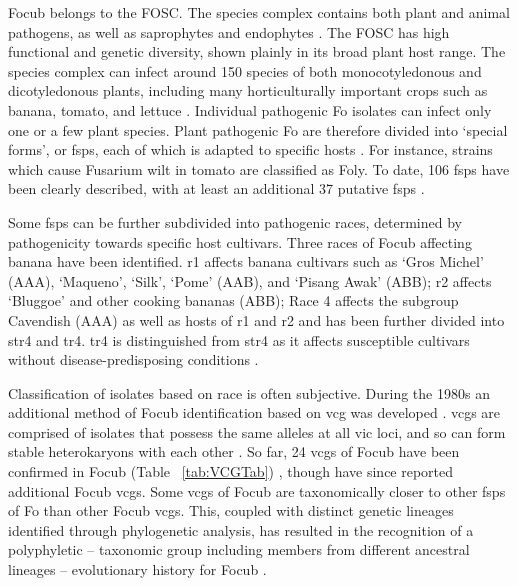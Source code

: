 \ac{Focub} belongs to the \acf{FOSC}. The species complex contains both plant and animal pathogens, as well as saprophytes and endophytes \parencite{Leslie2006}. The \ac{FOSC} has high functional and genetic diversity, shown plainly in its broad plant host range. The species complex can infect around 150 species of both monocotyledonous and dicotyledonous plants, including many horticulturally important crops such as banana, tomato, and lettuce \parencite{Edel-Hermann2019}.  Individual pathogenic \ac{Fo} isolates can infect only one or a few plant species. Plant pathogenic \ac{Fo} are therefore divided into ‘special forms’, or \acfp{fsp}, each of which is adapted to specific hosts \parencite{Snyder1940}. For instance, strains which cause Fusarium wilt in tomato are classified as \acl{Foly}. To date, 106 \acp{fsp} have been clearly described, with at least an additional 37 putative \acp{fsp} \parencite{Edel-Hermann2019}.   

Some \acp{fsp} can be further subdivided into pathogenic races, determined by pathogenicity towards specific host cultivars. Three races of \ac{Focub} affecting banana have been identified. \acf{r1}  affects banana cultivars such as ‘Gros Michel’ (AAA), ‘Maqueno’, ‘Silk’, ‘Pome’ (AAB), and ‘Pisang Awak’ (ABB); \acf{r2} affects ‘Bluggoe’ and other cooking bananas (ABB); Race 4 affects the subgroup Cavendish (AAA) as well as hosts of \ac{r1} and \ac{r2} \parencite{Ploetz2015a} and has been further divided into \ac{str4} and \acl{tr4}. \Ac{tr4} is distinguished from \ac{str4} as it affects susceptible cultivars without disease-predisposing conditions \parencite{Ploetz2015b}.  

Classification of isolates based on race is often subjective. During the 1980s an additional method of \ac{Focub} identification based on \acf{vcg} was developed \parencite{Correll1991}. \acp{vcg} are comprised of isolates that possess the same alleles at all \ac{vic} loci, and so can form stable heterokaryons with each other \parencite{Correll1991}. So far, 24 \acp{vcg} of \ac{Focub} have been confirmed in \ac{Focub} (Table ~\ref{tab:VCGTab}) \parencite{Czislowski2018}, though \textcite{Mostert2022} have since reported additional \ac{Focub} \acp{vcg}. Some \acp{vcg} of \ac{Focub} are taxonomically closer to other \acp{fsp} of \ac{Fo} than other \ac{Focub} \acp{vcg}. This, coupled with distinct genetic lineages identified through phylogenetic analysis, has resulted in the recognition of a polyphyletic – taxonomic group including members from different ancestral lineages – evolutionary history for \ac{Focub} \parencite{Koenig1997, Ploetz2007}. 

